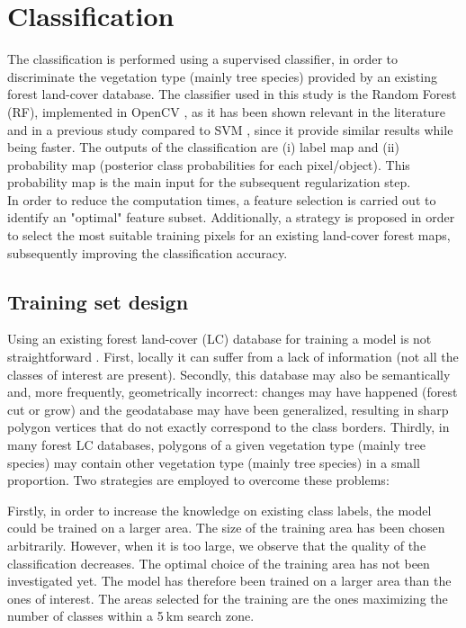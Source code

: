 \section{Classification}
The classification is performed using a supervised classifier, in order to discriminate the vegetation type (mainly tree species) provided by an existing forest land-cover database. The classifier used in this study is the Random Forest (RF), implemented in OpenCV \citep{opencv}, as it has been shown relevant in the literature \citep{belgiu2016random} and in a previous study compared to SVM \citep{dechesne2016forest}, since it provide similar results while being faster. The outputs of the classification are (i) label map and (ii) probability map (posterior class probabilities for each pixel/object). This probability map is the main input for the subsequent regularization step. \\
In order to reduce the computation times, a feature selection is carried out to identify an "optimal" feature subset. Additionally, a strategy is proposed in order to select the most suitable training pixels for an existing land-cover forest maps, subsequently improving the classification accuracy.

\subsection{Training set design}
Using an existing forest land-cover (LC) database for training a model is not straightforward \citep{isprsannals-II-3-W2-13-2013,rs6053965,isprs-annals-III-7-133-2016}. First, locally it can suffer from a lack of information (not all the classes of interest are present). Secondly, this database may also be semantically and, more frequently, geometrically incorrect: changes may have happened (forest cut or grow) and the geodatabase may have been generalized, resulting in sharp polygon vertices that do not exactly correspond to the class borders. Thirdly, in many forest LC databases, polygons of a given vegetation type (mainly tree species) may contain other vegetation type (mainly tree species) in a small proportion. Two strategies are employed to overcome these problems: 

Firstly, in order to increase the knowledge on existing class labels, the model could be trained on a larger area. The size of the training area has been chosen arbitrarily. However, when it is too large, we observe that the quality of the classification decreases. The optimal choice of the training area has not been investigated yet. {The model has therefore been trained on a larger area than the ones of interest}. The areas selected for the training are the ones maximizing the number of classes within a 5$\:$km search zone.

